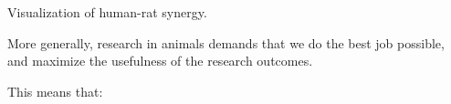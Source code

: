 \documentclass{tufte-book}
\begin{document}
\begin{marginfigure}
\caption{Visualization of human-rat synergy.}
\label{fig:rat-mask}
\end{marginfigure}

More generally, research in animals demands that we do the best job
possible, and maximize the usefulness of the research outcomes.

This means that:
\end{document}
